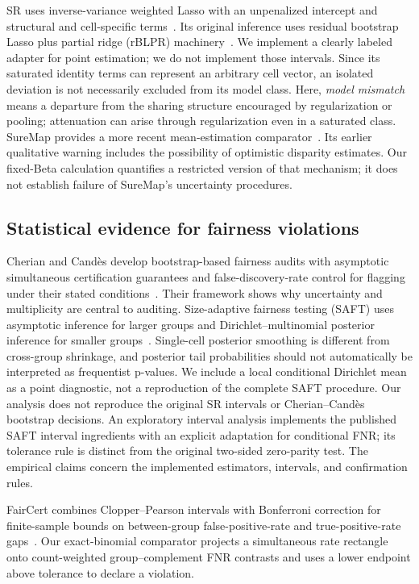 \documentclass[Afour,sageh,times,doublespace]{sagej}
\begin{document}
SR uses inverse-variance weighted Lasso with an unpenalized intercept and structural and cell-specific terms~\citep{herlihy2024structured,tibshirani1996lasso}. Its original inference uses residual bootstrap Lasso plus partial ridge (rBLPR) machinery~\citep{herlihy2024structured,liu2020bootstrap}. We implement a clearly labeled adapter for point estimation; we do not implement those intervals. Since its saturated identity terms can represent an arbitrary cell vector, an isolated deviation is not necessarily excluded from its model class. Here, \emph{model mismatch} means a departure from the sharing structure encouraged by regularization or pooling; attenuation can arise through regularization even in a saturated class. SureMap provides a more recent mean-estimation comparator~\citep{khodak2024suremap}. Its earlier qualitative warning includes the possibility of optimistic disparity estimates. Our fixed-Beta calculation quantifies a restricted version of that mechanism; it does not establish failure of SureMap's uncertainty procedures.

\subsection{Statistical evidence for fairness violations}
Cherian and Cand\`es develop bootstrap-based fairness audits with asymptotic simultaneous certification guarantees and false-discovery-rate control for flagging under their stated conditions~\citep{cherian2024statistical}. Their framework shows why uncertainty and multiplicity are central to auditing. Size-adaptive fairness testing (SAFT) uses asymptotic inference for larger groups and Dirichlet--multinomial posterior inference for smaller groups~\citep{ferrara2025saft}. Single-cell posterior smoothing is different from cross-group shrinkage, and posterior tail probabilities should not automatically be interpreted as frequentist p-values. We include a local conditional Dirichlet mean as a point diagnostic, not a reproduction of the complete SAFT procedure. Our analysis does not reproduce the original SR intervals or Cherian--Cand\`es bootstrap decisions. An exploratory interval analysis implements the published SAFT interval ingredients with an explicit adaptation for conditional FNR; its tolerance rule is distinct from the original two-sided zero-parity test. The empirical claims concern the implemented estimators, intervals, and confirmation rules.

FairCert combines Clopper--Pearson intervals with Bonferroni correction for finite-sample bounds on between-group false-positive-rate and true-positive-rate gaps~\citep{sikder2026faircert}. Our exact-binomial comparator projects a simultaneous rate rectangle onto count-weighted group--complement FNR contrasts and uses a lower endpoint above tolerance to declare a violation.
\end{document}
